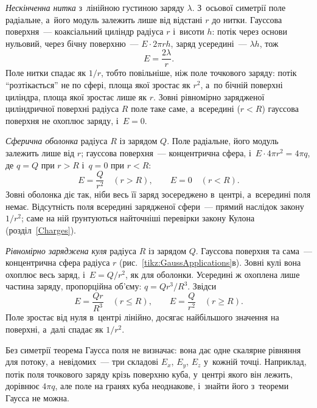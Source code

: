 \emph{Нескінченна нитка} з~лінійною густиною заряду $\lambda$. З~осьової симетрії поле
радіальне, а~його модуль залежить лише від відстані $r$ до нитки. Гауссова
поверхня~--- коаксіальний циліндр радіуса $r$ і~висоти $h$: потік через основи нульовий,
через бічну поверхню~--- $E\cdot2\pi rh$, заряд усередині~--- $\lambda h$, тож
\begin{equation}\label{eq:ThreadField}
	E = \frac{2\lambda}{r}.
\end{equation}
Поле нитки спадає як $1/r$, тобто повільніше, ніж поле точкового заряду: потік
\enquote{розтікається} не по сфері, площа якої зростає як $r^2$, а~по бічній поверхні
циліндра, площа якої зростає лише як $r$. Зовні рівномірно зарядженої циліндричної
поверхні радіуса $R$ поле таке саме, а~всередині ($r<R$) гауссова поверхня не охоплює
заряду, і~$E=0$.

\emph{Сферична оболонка} радіуса $R$ із зарядом $Q$. Поле радіальне, його модуль залежить
лише від $r$; гауссова поверхня~--- концентрична сфера, і~$E\cdot4\pi r^2 = 4\pi q$, де
$q = Q$ при $r>R$ і~$q = 0$ при $r<R$:
\begin{equation}\label{eq:ShellField}
	E = \frac{Q}{r^2}\quad(r>R),\qquad E = 0\quad(r<R).
\end{equation}
Зовні оболонка діє так, ніби весь її заряд зосереджено в~центрі, а~всередині поля немає.
Відсутність поля всередині зарядженої сфери~--- прямий наслідок закону $1/r^2$; саме на
ній ґрунтуються найточніші перевірки закону Кулона (розділ~\ref{Charges}).

\emph{Рівномірно заряджена куля} радіуса $R$ із зарядом $Q$. Гауссова поверхня та сама~---
концентрична сфера радіуса $r$ (рис.~\ref{tikz:GaussApplications}в). Зовні кулі вона охоплює весь заряд, і~$E = Q/r^2$, як
для оболонки. Усередині ж охоплена лише частина заряду, пропорційна об'єму:
$q = Q r^3/R^3$. Звідси
\begin{equation}\label{eq:BallField}
	E = \frac{Qr}{R^3}\quad(r\leqslant R),\qquad E = \frac{Q}{r^2}\quad(r\geqslant R).
\end{equation}
Поле зростає від нуля в~центрі лінійно, досягає найбільшого значення на поверхні, а~далі
спадає як $1/r^2$.

\begin{Attention}
	Без симетрії теорема Гаусса поля не визначає: вона дає одне скалярне рівняння для
	потоку, а~невідомих~--- три складові $E_x$, $E_y$, $E_z$ у~кожній точці. Наприклад,
	потік поля точкового заряду крізь поверхню куба, у~центрі якого він лежить, дорівнює
	$4\pi q$, але поле на гранях куба неоднакове, і~знайти його з~теореми Гаусса не можна.
\end{Attention}



